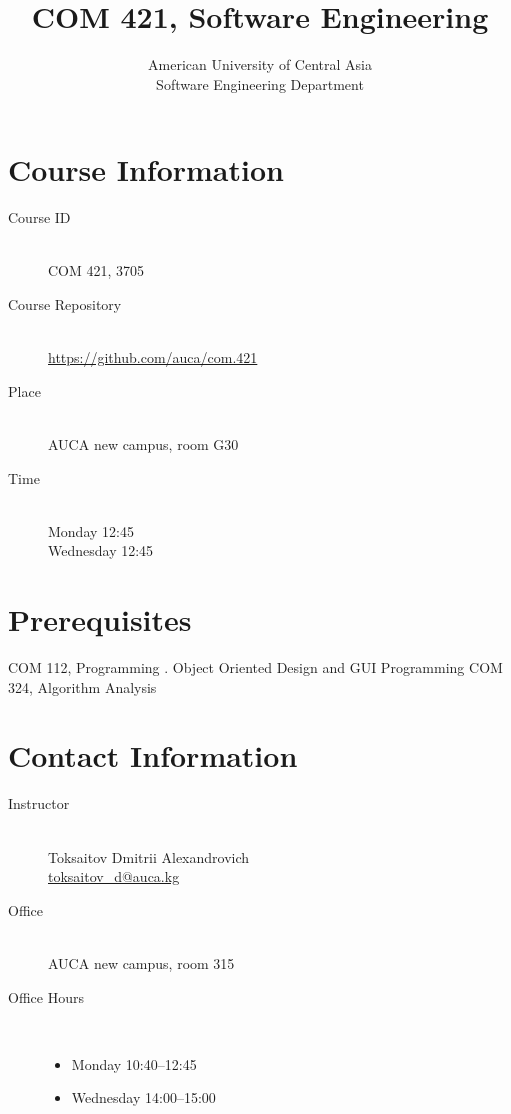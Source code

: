 \documentclass[12pt,a4paper,oneside]{article}
\begin{document}
    \title{COM 421, Software Engineering}
    \author{
        American University of Central Asia\\
        Software Engineering Department
    }
    \date{}
    \maketitle

    \section{Course Information}

        \begin{description}
            \item[Course ID]\hfill\\
                COM 421, 3705
            \item[Course Repository]\hfill\\
                \url{https://github.com/auca/com.421}
            \item[Place]\hfill\\
                AUCA new campus, room G30
            \item[Time]\hfill\\
                Monday 12:45\\
                Wednesday 12:45
        \end{description}

    \section{Prerequisites}

        COM 112, Programming \uppercase\expandafter{\relax}. Object Oriented Design and GUI Programming
        COM 324, Algorithm Analysis

        \section{Contact Information}

            \begin{description}
                \item[Instructor]\hfill\\
                    Toksaitov Dmitrii Alexandrovich\\
                    \href{mailto:toksaitov_d@auca.kg}{toksaitov\_d@auca.kg}
                \item[Office]\hfill\\
                    AUCA new campus, room 315
                \item[Office Hours]\hfill\\
                    \begin{itemize}
                        \item Monday 10:40--12:45
                        \item Wednesday 14:00--15:00
                    \end{itemize}
            \end{description}
\end{document}
